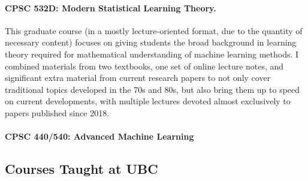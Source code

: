 \documentclass[10pt]{article}
\begin{document}
  \paragraph{CPSC 532D: Modern Statistical Learning Theory.}
  \continuing{}
  This graduate course (in a mostly lecture-oriented format, due to the quantity of necessary content) focuses on
  giving students the broad background in learning theory
  required for mathematical understanding of machine learning methods.
  I combined materials from two textbooks, one set of online lecture notes, and significant extra material from current research papers to not only cover traditional topics developed in the 70s and 80s, but also bring them up to speed on current developments, with multiple lectures devoted almost exclusively to papers published since 2018.

  \paragraph{CPSC 440/540: Advanced Machine Learning}


\subsection{Courses Taught at UBC}
\end{document}
